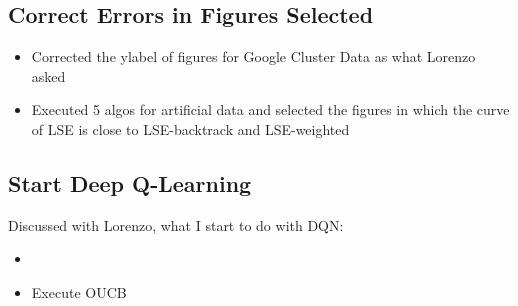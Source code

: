 \subsection*{Correct Errors in Figures Selected}

\begin{itemize}
	\item Corrected the ylabel of figures for Google Cluster Data as what Lorenzo asked
	\item Executed 5 algos for artificial data and selected the figures in which the curve of LSE is close to LSE-backtrack and LSE-weighted

\end{itemize}


\subsection*{Start Deep Q-Learning}

Discussed with Lorenzo, what I start to do with DQN:
\begin{itemize}
	\item 
	
	\item Execute OUCB
	
	
\end{itemize}





